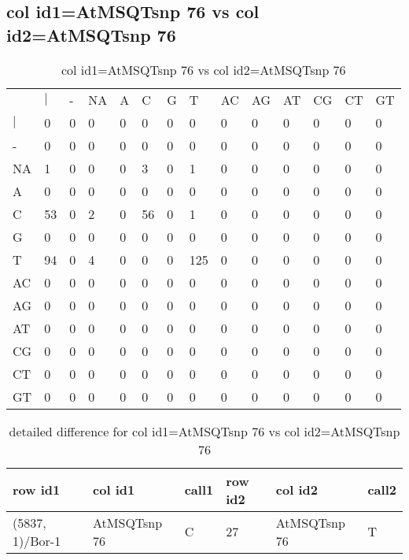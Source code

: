 \subsection{col id1=AtMSQTsnp 76 vs col id2=AtMSQTsnp 76}
\begin{center}
\begin{longtable}{|l|l|l|l|l|l|l|l|l|l|l|l|l|l|}
\caption{col id1=AtMSQTsnp 76 vs col id2=AtMSQTsnp 76} \label{table_dm960}\\
\hline
\\
\hline
&$|$&-&NA&A&C&G&T&AC&AG&AT&CG&CT&GT\\
$|$&0&0&0&0&0&0&0&0&0&0&0&0&0\\
-&0&0&0&0&0&0&0&0&0&0&0&0&0\\
NA&1&0&0&0&3&0&1&0&0&0&0&0&0\\
A&0&0&0&0&0&0&0&0&0&0&0&0&0\\
C&53&0&2&0&56&0&1&0&0&0&0&0&0\\
G&0&0&0&0&0&0&0&0&0&0&0&0&0\\
T&94&0&4&0&0&0&125&0&0&0&0&0&0\\
AC&0&0&0&0&0&0&0&0&0&0&0&0&0\\
AG&0&0&0&0&0&0&0&0&0&0&0&0&0\\
AT&0&0&0&0&0&0&0&0&0&0&0&0&0\\
CG&0&0&0&0&0&0&0&0&0&0&0&0&0\\
CT&0&0&0&0&0&0&0&0&0&0&0&0&0\\
GT&0&0&0&0&0&0&0&0&0&0&0&0&0\\
\hline
\end{longtable}
\end{center}

\begin{center}
\begin{longtable}{|l|l|l|l|l|l|}
\caption{detailed difference for col id1=AtMSQTsnp 76 vs col id2=AtMSQTsnp 76} \label{table_dm961}\\
\hline
row id1&col id1&call1&row id2&col id2&call2\\
\hline
(5837, 1)/Bor-1&AtMSQTsnp 76&C&27&AtMSQTsnp 76&T\\
\hline
\end{longtable}
\end{center}

